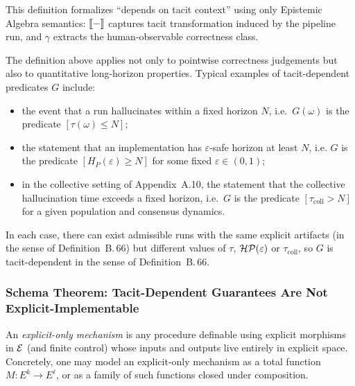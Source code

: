 \begin{remark}
This definition formalizes ``depends on tacit context'' using only Epistemic Algebra semantics: $\llbracket - \rrbracket$ captures tacit transformation induced by the pipeline run, and $\gamma$ extracts the human-observable correctness class.
\end{remark}
\begin{remark}
\label{rem:tacit-dependent-examples}
The definition above applies not only to pointwise correctness
judgements but also to quantitative long-horizon properties. Typical
examples of tacit-dependent predicates $G$ include:
\begin{itemize}
  \item the event that a run hallucinates within a fixed horizon $N$,
        i.e.\ $G(\omega)$ is the predicate $[\tau(\omega) \le N]$;
  \item the statement that an implementation has $\varepsilon$-safe horizon at least $N$, i.e.
  $G$ is the predicate $[H_P(\varepsilon) \ge N]$ for some fixed $\varepsilon \in (0,1)$;

  \item in the collective setting of Appendix~A.10, the statement that the
        collective hallucination time exceeds a fixed horizon, i.e.\
        $G$ is the predicate $[\tau_{\mathrm{coll}} > N]$ for a given
        population and consensus dynamics.
\end{itemize}
In each case, there can exist admissible runs with the same explicit
artifacts (in the sense of Definition~B.\,66) but different values of
$\tau$, $\mathcal{HP}(\varepsilon)$ or $\tau_{\mathrm{coll}}$, so $G$ is
tacit-dependent in the sense of Definition~B.\,66.
\end{remark}

\subsubsection{Schema Theorem: Tacit-Dependent Guarantees Are Not Explicit-Implementable}
\begin{definition}
An \emph{explicit-only mechanism} is any procedure definable using explicit morphisms in $\mathcal{E}$ (and finite control) whose inputs and outputs live entirely in explicit space. Concretely, one may model an explicit-only mechanism as a total function $M:E^k\to E^\ell$, or as a family of such functions closed under composition.
\end{definition}

